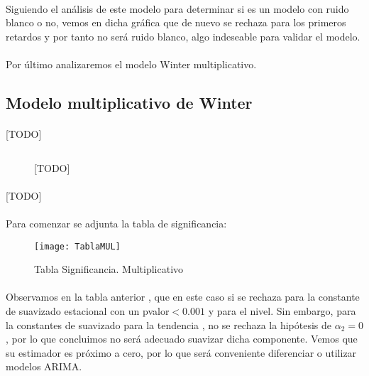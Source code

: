 \documentclass[a4paper, spanish]{article}
\begin{document}
      \paragraph{}
      Siguiendo el análisis de este modelo para determinar si es un modelo con ruido blanco o no, vemos en dicha gráfica que de nuevo se rechaza para los primeros retardos y por tanto no será ruido blanco, algo indeseable para validar el modelo.

      \paragraph{}
      Por último analizaremos el modelo Winter multiplicativo.

    \subsection{Modelo multiplicativo de Winter}

      \paragraph{}
      [TODO]

      \begin{figure}[h]
        \centering
        \inputminted{SAS}{./res/code/b-01-esm-3.sas}
        \caption{[TODO]}
        \label{code:b_esm_3}
      \end{figure}

      \paragraph{}
      [TODO]

      \paragraph{}
      Para comenzar se adjunta la tabla de significancia:

      \begin{figure}[h]
        \centering
        \texttt{[image: TablaMUL]}
        \caption{Tabla Significancia. Multiplicativo}
        \label{}
      \end{figure}

      \paragraph{}
      Observamos en la tabla anterior , que en este caso si se rechaza para la constante de suavizado estacional con un pvalor$ <0.001$ y para el nivel. Sin embargo, para la constantes de suavizado para la tendencia , no se rechaza la hipótesis de $\alpha_2 =0$, por lo que concluimos no será adecuado suavizar dicha componente. Vemos que su estimador es próximo a cero, por lo que será conveniente diferenciar o utilizar modelos ARIMA.
\end{document}
